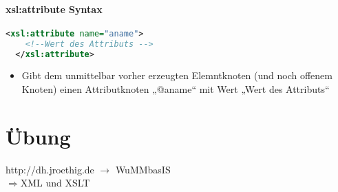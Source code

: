 \paragraph{xsl:attribute Syntax}\hspace{1mm}
\begin{lstlisting}[caption={xsl:attribute Syntax}, label={lst:xsl:attribute}, language={XML}]
  <xsl:attribute name="aname">
    <!--Wert des Attributs -->
  </xsl:attribute>
\end{lstlisting}
\begin{itemize}
\item Gibt dem unmittelbar vorher erzeugten Elemntknoten (und noch offenem Knoten) einen Attributknoten „@aname“ mit Wert „Wert des Attributs“
\end{itemize}

\section{Übung}
http://dh.jroethig.de $\rightarrow$ WuMMbasIS\\
$\Rightarrow$XML und XSLT